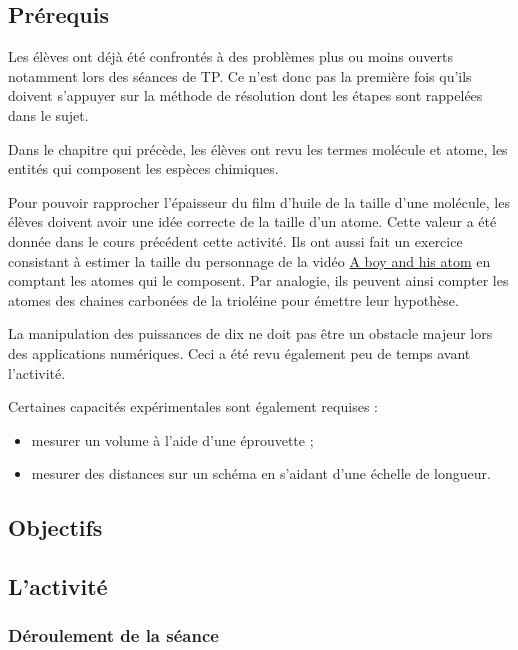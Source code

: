 \documentclass[12pt,a4paper]{article}
\begin{document}
\subsection{Prérequis}

Les élèves ont déjà été confrontés à des problèmes plus ou moins ouverts notamment lors des séances de TP.
Ce n'est donc pas la première fois qu'ils doivent s'appuyer sur la méthode de résolution dont les étapes sont rappelées dans le sujet.

Dans le chapitre qui précède, les élèves ont revu les termes molécule et atome, les entités qui composent les espèces chimiques.

Pour pouvoir rapprocher l'épaisseur du film d'huile de la taille d'une molécule, les élèves doivent avoir une idée correcte de la taille d'un atome.
Cette valeur a été donnée dans le cours précédent cette activité.
Ils ont aussi fait un exercice consistant à estimer la taille du personnage de la vidéo \href{https://youtu.be/oSCX78-8-q0}{A boy and his atom} en comptant les \og atomes \fg{} qui le composent.
Par analogie, ils peuvent ainsi compter les atomes des chaines carbonées de la trioléine pour émettre leur hypothèse.

La manipulation des puissances de dix ne doit pas être un obstacle majeur lors des applications numériques.
Ceci a été revu également peu de temps avant l'activité.

Certaines capacités expérimentales sont également requises :
\begin{itemize}
\item mesurer un volume à l'aide d'une éprouvette ;
\item mesurer des distances sur un schéma en s'aidant d'une échelle de longueur.
\end{itemize}

\subsection{Objectifs}

\subsection{L'activité}

\subsubsection{Déroulement de la séance}
\end{document}
